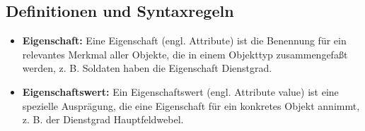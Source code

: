       \subsection{Definitionen und Syntaxregeln}
        \begin{merke}
          \begin{itemize}
            \item \textbf{Eigenschaft:} Eine Eigenschaft (engl. Attribute) ist
            die Benennung f\"ur ein relevantes Merkmal aller Objekte, die in
            einem Objekttyp zusammengefa\ss t werden, z. B. Soldaten haben die
            Eigenschaft Dienstgrad.
            \item \textbf{Eigenschaftswert:} Ein Eigenschaftswert (engl.
            Attribute value) ist eine spezielle Auspr\"agung, die eine
            Eigenschaft f\"ur ein konkretes Objekt annimmt, z. B. der Dienstgrad
            Hauptfeldwebel.
          \end{itemize}
          \end{merke}

